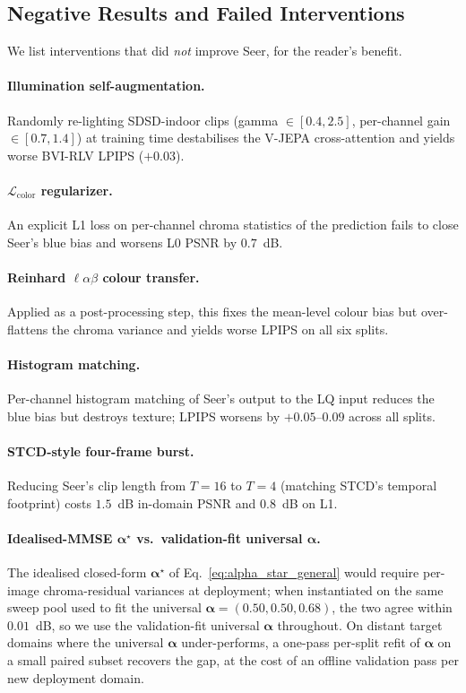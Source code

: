 \subsection{Negative Results and Failed Interventions}\label{app:negatives}

We list interventions that did \emph{not} improve Seer, for the reader's benefit.

\paragraph{Illumination self-augmentation.} Randomly re-lighting SDSD-indoor clips (gamma $\in[0.4, 2.5]$, per-channel gain $\in[0.7, 1.4]$) at training time destabilises the V-JEPA cross-attention and yields worse BVI-RLV LPIPS ($+0.03$).

\paragraph{$\mathcal{L}_{\text{color}}$ regularizer.} An explicit L1 loss on per-channel chroma statistics of the prediction fails to close Seer's blue bias and worsens L0 PSNR by $0.7$~dB.

\paragraph{Reinhard $\ell\alpha\beta$ colour transfer.} Applied as a post-processing step, this fixes the mean-level colour bias but over-flattens the chroma variance and yields worse LPIPS on all six splits.

\paragraph{Histogram matching.} Per-channel histogram matching of Seer's output to the LQ input reduces the blue bias but destroys texture; LPIPS worsens by $+0.05$--$0.09$ across all splits.

\paragraph{STCD-style four-frame burst.} Reducing Seer's clip length from $T{=}16$ to $T{=}4$ (matching STCD's temporal footprint) costs $1.5$~dB in-domain PSNR and $0.8$~dB on L1.

\paragraph{Idealised-MMSE $\boldsymbol{\alpha}^{\star}$ vs.\ validation-fit universal $\boldsymbol{\alpha}$.} The idealised closed-form $\boldsymbol{\alpha}^{\star}$ of Eq.~\eqref{eq:alpha_star_general} would require per-image chroma-residual variances at deployment; when instantiated on the same sweep pool used to fit the universal $\boldsymbol{\alpha}{=}(0.50,0.50,0.68)$, the two agree within $0.01$~dB, so we use the validation-fit universal $\boldsymbol{\alpha}$ throughout. On distant target domains where the universal $\boldsymbol{\alpha}$ under-performs, a one-pass per-split refit of $\boldsymbol{\alpha}$ on a small paired subset recovers the gap, at the cost of an offline validation pass per new deployment domain.


